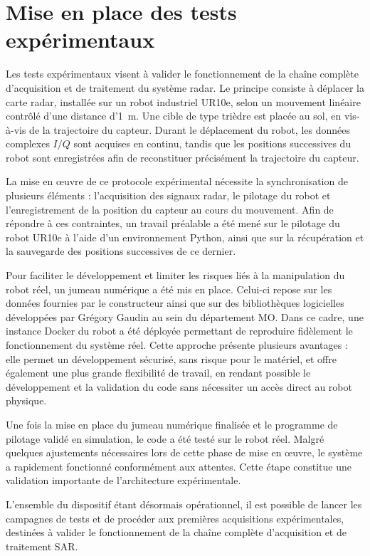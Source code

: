\section{Mise en place des tests expérimentaux}

Les tests expérimentaux visent à valider le fonctionnement de la chaîne complète d’acquisition et de traitement du système radar. Le principe consiste à déplacer la carte radar, installée sur un robot industriel UR10e, selon un mouvement linéaire contrôlé d’une distance d’1~m. Une cible de type trièdre est placée au sol, en vis-à-vis de la trajectoire du capteur. Durant le déplacement du robot, les données complexes $I/Q$ sont acquises en continu, tandis que les positions successives du robot sont enregistrées afin de reconstituer précisément la trajectoire du capteur.

La mise en œuvre de ce protocole expérimental nécessite la synchronisation de plusieurs éléments : l’acquisition des signaux radar, le pilotage du robot et l’enregistrement de la position du capteur au cours du mouvement. Afin de répondre à ces contraintes, un travail préalable a été mené sur le pilotage du robot UR10e à l’aide d’un environnement Python, ainsi que sur la récupération et la sauvegarde des positions successives de ce dernier.

Pour faciliter le développement et limiter les risques liés à la manipulation du robot réel, un jumeau numérique a été mis en place. Celui-ci repose sur les données fournies par le constructeur ainsi que sur des bibliothèques logicielles développées par Grégory Gaudin au sein du département MO.
Dans ce cadre, une instance Docker du robot a été déployée permettant de reproduire fidèlement le fonctionnement du système réel. Cette approche présente plusieurs avantages : elle permet un développement sécurisé, sans risque pour le matériel, et offre également une plus grande flexibilité de travail, en rendant possible le développement et la validation du code sans nécessiter un accès direct au robot physique.

Une fois la mise en place du jumeau numérique finalisée et le programme de pilotage validé en simulation, le code a été testé sur le robot réel. Malgré quelques ajustements nécessaires lors de cette phase de mise en œuvre, le système a rapidement fonctionné conformément aux attentes. Cette étape constitue une validation importante de l’architecture expérimentale.

L’ensemble du dispositif étant désormais opérationnel, il est possible de lancer les campagnes de tests et de procéder aux premières acquisitions expérimentales, destinées à valider le fonctionnement de la chaîne complète d’acquisition et de traitement SAR.


